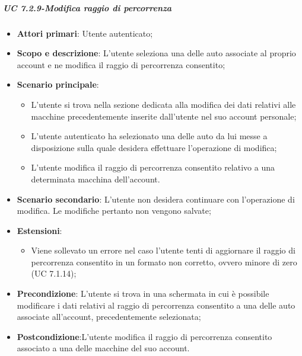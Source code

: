             \subparagraph{UC 7.2.9-Modifica raggio di percorrenza}
            \begin{itemize}
                \item \textbf{Attori primari}: Utente autenticato;
                
                \item \textbf{Scopo e descrizione}: L'utente seleziona una delle auto associate al proprio account e ne modifica il raggio di percorrenza consentito; 
                \item \textbf{Scenario principale}:
                    \begin{itemize}
                        \item L'utente si trova nella sezione dedicata alla modifica dei dati relativi alle macchine precedentemente inserite dall'utente nel suo account personale;
                        \item L'utente autenticato ha selezionato una delle auto da lui messe a disposizione sulla quale desidera effettuare l'operazione di modifica;
                        \item L'utente modifica il raggio di percorrenza consentito relativo a una determinata macchina dell'account.
                    \end{itemize}
                \item \textbf{Scenario secondario}: L'utente non desidera continuare con l'operazione di modifica. Le modifiche pertanto non vengono salvate;
                \item \textbf{Estensioni}:
                    \begin{itemize}
                        \item Viene sollevato un errore nel caso l'utente tenti di aggiornare il raggio di percorrenza consentito in un formato non corretto, ovvero minore di zero (UC 7.1.14); 
                    \end{itemize}
                \item \textbf{Precondizione}: L'utente si trova in una schermata in cui è possibile modificare i dati relativi al raggio di percorrenza consentito a una delle auto associate all'account, precedentemente selezionata;
                \item \textbf{Postcondizione}:L'utente modifica il raggio di percorrenza consentito associato a una delle macchine del suo account.
            \end{itemize}
            
